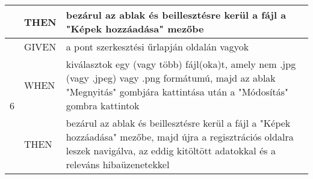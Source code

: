 \begin{center}
\begin{longtable}{ | m{}| m{} | m{} | }
		\cline{2-3} 
		& THEN & bezárul az ablak és beillesztésre kerül a fájl a "Képek hozzáadása" mezőbe \\
		\hline
		\multirow{3}{*}{6} & GIVEN & a pont szerkesztési űrlapján oldalán vagyok \\
		\cline{2-3}
		& WHEN & kiválasztok egy (vagy több) fájl(oka)t, amely nem .jpg (vagy .jpeg) vagy .png formátumú, majd az ablak "Megnyitás" gombjára kattintása után a "Módosítás" gombra kattintok \\
		\cline{2-3} 
		& THEN & bezárul az ablak és beillesztésre kerül a fájl a "Képek hozzáadása" mezőbe, majd újra a regisztrációs oldalra leszek navigálva, az eddig kitöltött adatokkal és a releváns hibaüzenetekkel \\
		\hline
	\end{longtable}
	\label{tab:sim_trash_edit}
\end{center}

